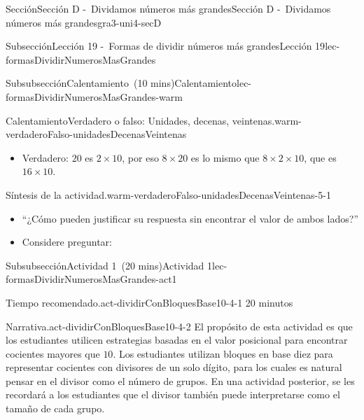 \documentclass[oneside,10pt,]{article}
\newlength{\fillinmaxwidth}
\newlength{\fillincontract}
\newlength{\charmaxwidth}\setlength{\charmaxwidth}{0.5em}
\newlength{\charminwidth}\setlength{\charminwidth}{0.1em}
\newlength{\fillinheight}
\newcommand{\fillintext}[1]{%
\setlength{\fillinmaxwidth}{#1\charmaxwidth}%
\setlength{\fillincontract}{#1\charminwidth}%
\setlength{\fillinheight}{\baselineskip}\addtolength{\fillinheight}{1.2pt}%
\strut\nobreak\leaders\vbox{\hrule width 0.3pt height 0.3pt \vskip -1.2pt}\hskip 1\fillinmaxwidth minus \fillincontract\nobreak\strut%
}
\begin{document}
\begin{sectionptx}{Sección}{Sección D -~Dividamos números más grandes}{}{Sección D -~Dividamos números más grandes}{}{}{gra3-uni4-secD}
\begin{subsectionptx}{Subsección}{Lección 19 -~Formas de dividir números más grandes}{}{Lección 19}{}{}{lec-formasDividirNumerosMasGrandes}
\begin{subsubsectionptx}{Subsubsección}{Calentamiento~(10 mins)}{}{Calentamiento}{}{}{lec-formasDividirNumerosMasGrandes-warm}
\begin{exploration}{Calentamiento}{Verdadero o falso: Unidades, decenas, veintenas.}{warm-verdaderoFalso-unidadesDecenasVeintenas}
\begin{itemize}[label=\textbullet]
\item{}Verdadero: \(20\) es \(2 \times 10\), por eso \(8 \times 20\) es lo mismo que \(8 \times 2 \times 10\), que es \(16 \times 10\).%
\end{itemize}
\end{exploration}%
\par
\begin{paragraphs}{Síntesis de la actividad.}{warm-verdaderoFalso-unidadesDecenasVeintenas-5-1}%
%
\begin{itemize}[label=\textbullet]
\item{}``¿Cómo pueden justificar su respuesta sin encontrar el valor de ambos lados?''%
\item{}Considere preguntar:%
%
\end{itemize}
\end{paragraphs}%
\end{subsubsectionptx}
%
%
\typeout{************************************************}
\typeout{************************************************}
%
\begin{subsubsectionptx}{Subsubsección}{Actividad 1~(20 mins)}{}{Actividad 1}{}{}{lec-formasDividirNumerosMasGrandes-act1}
\par
\begin{paragraphs}{Tiempo recomendado.}{act-dividirConBloquesBase10-4-1}%
20 minutos%
\end{paragraphs}%
\begin{paragraphs}{Narrativa.}{act-dividirConBloquesBase10-4-2}%
El propósito de esta actividad es que los estudiantes utilicen estrategias basadas en el valor posicional para encontrar cocientes mayores que \(10\). Los estudiantes utilizan bloques en base diez para representar cocientes con divisores de un solo dígito, para los cuales es natural pensar en el divisor como el número de grupos. En una actividad posterior, se les recordará a los estudiantes que el divisor también puede interpretarse como el tamaño de cada grupo.%
\par

\end{paragraphs}
\end{subsubsectionptx}
\end{subsectionptx}
\end{sectionptx}
\end{document}
